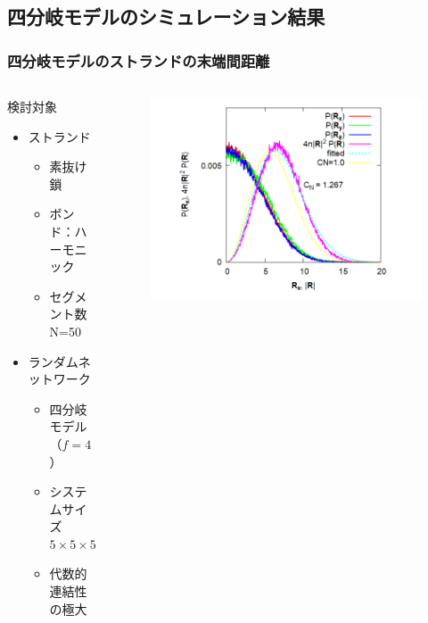 \documentclass[11pt, dvipdfmx]{beamer}
\begin{document}
\subsection{四分岐モデルのシミュレーション結果}
\begin{frame}
\frametitle{四分岐モデルのストランドの末端間距離}

\vspace{-3mm}

\begin{columns}[totalwidth=\linewidth]

\begin{block}{検討対象}
\begin{itemize}
\item
ストランド
	\begin{itemize}
	\item 
	素抜け鎖
 	\item 
 	ボンド：ハーモニック
 	\item
 	セグメント数 N=50 
	\end{itemize}
\item
ランダムネットワーク
	\begin{itemize}
	\item
	四分岐モデル（$f=4$）
	\item
	システムサイズ\\
	$5\times 5\times 5$
	\item
	代数的連結性の極大
	\end{itemize}
\end{itemize}
\end{block}

\vspace{-3mm}
\begin{figure}
\includegraphics[width=1.2\columnwidth]{./fig/4chain_E2E_init.png}
\end{figure}
\end{columns}


\end{frame}
\end{document}

